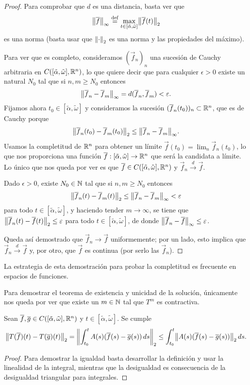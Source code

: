 \documentclass[../ecuaciones_diferenciales.tex]{subfiles}
\begin{document}
\begin{proof}
	Para comprobar que \(d\) es una distancia, basta ver que
	\[\norm{\vec{f}}_\infty
		\assign \max_{t \in [\tilde{\alpha}, \tilde{\omega}]}
			\norm{\vec{f}(t)}_2\]
	es una norma (basta usar que \(\norm{\cdot}_2\) es una norma y las
	propiedades del máximo).

	Para ver que es completo, consideramos \((\vec{f}_n)_n\) una sucesión de
	Cauchy arbitraria en \(C([\tilde{\alpha}, \tilde{\omega}], \mathbb{R}^n)\),
	lo que quiere decir que para cualquier \(\epsilon > 0\) existe un
	natural \(N_0\) tal que si \(n, m \geq N_0\) entonces
	\[\norm{\vec{f}_n - \vec{f}_m}_\infty
		= d(\vec{f}_n, \vec{f}_m) < \epsilon.\]
	Fijamos ahora \(t_0 \in [\tilde{\alpha}, \tilde{\omega}]\) y consideramos la
	sucesión \((\overline{f}_n(t_0))_n \subset \mathbb{R}^n\), que es de Cauchy porque
	\[\norm{\vec{f}_n(t_0) - \vec{f}_m(t_0)}_2
		\leq \norm{\vec{f}_n - \vec{f}_m}_\infty.\]
	Usamos la completitud de \(\mathbb{R}^n\) para obtener un límite
	\(\vec{f}(t_0) = \lim_n \vec{f}_n(t_0)\), lo
	que nos proporciona una función
	\(\overline{f}: [\tilde{\alpha}, \tilde{\omega}] \to \mathbb{R}^n\) que será la candidata
	a límite. Lo único que nos queda por ver es que
	\(\overline{f} \in C([\tilde{\alpha}, \tilde{\omega}], \mathbb{R}^n)\) y
	\(\vec{f}_n \overset{d}{\to} \vec{f}\).

	Dado \(\epsilon > 0\), existe \(N_0 \in \mathbb{N}\) tal que si \(n, m \geq N_0\)
	entonces
	\[\norm{\vec{f}_n(t) - \vec{f}_m(t)}_2
		\leq \norm{\vec{f}_n - \vec{f}_m}_\infty < \epsilon\]
	para todo \(t \in [\tilde{\alpha}, \tilde{\omega}]\), y haciendo tender
	\(m \to \infty\), se tiene que
	\(\norm{\vec{f}_n(t) - \vec{f}(t)}_2 \leq \epsilon\) para todo
	\(t \in [\tilde{\alpha}, \tilde{\omega}]\), de donde
	\(\norm{\vec{f}_n - \vec{f}}_\infty \leq \epsilon\).

	Queda así demostrado que \(\vec{f}_n \to \vec{f}\) uniformemente;
	por un lado, esto implica que \(\vec{f}_n \overset{d}{\to} \vec{f}\) y,
	por otro, que \(\vec{f}\) es continua (por serlo las \(\vec{f}_n\)).
\end{proof}

\begin{remark}
	La estrategia de esta demostración para probar la completitud es frecuente en
	espacios de funciones.
\end{remark}

Para demostrar el teorema de existencia y unicidad de la solución, únicamente
nos queda por ver que existe un \(m \in \mathbb{N}\) tal que \(T^m\) es contractiva.

\begin{lemma} \label{prop:operator_int_ineq}
	Sean \(\overline{f}, \overline{g} \in C([\tilde{\alpha}, \tilde{\omega}], \mathbb{R}^n)\) y
	\(t \in [\tilde{\alpha}, \tilde{\omega}]\). Se cumple
	\[\norm{T(\vec{f})(t) - T(\vec{g})(t)}_2
		= \norm{\int_{t_0}^t A(s)(\vec{f}(s) - \vec{g}(s)) \dif s}_2
		\leq \int_{t_0}^t \norm{A(s)(\vec{f}(s) - \vec{g}(s))}_2 \dif s.\]
\end{lemma}
\begin{proof}
    Para demostrar la igualdad basta desarrollar la definición y usar la
    linealidad de la integral, mientras que la desigualdad es consecuencia
    de la desigualdad triangular para integrales.
\end{proof}
\end{document}
